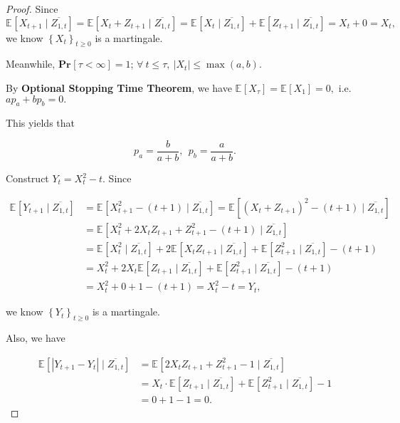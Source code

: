 \documentclass{article}
\renewcommand{\Pr}[2]{\mathbf{Pr}_{#1}\left[#2\right]}
\newcommand{\set}[1]{\left\{#1\right\}}
\newcommand{\staExp}[2]{\mathbb{E}_{#1}\left[#2\right]}
\begin{document}
\begin{proof}
    \hspace{1.3em}
    Since $\staExp{}{X_{t+1}\mid\overline{Z_{1,t}}}=\staExp{}{X_t+Z_{t+1}\mid\overline{Z_{1,t}}}=\staExp{}{X_t\mid\overline{Z_{1,t}}}+\staExp{}{Z_{t+1}\mid\overline{Z_{1,t}}} = X_t+0=X_t,$ we know $\set{X_t}_{t\geq0}$ is a martingale.
    
    \hspace{1.3em}
    Meanwhile, $\Pr{}{\tau<\infty}=1$; $\forall\ t\le\tau,\ |X_t|\le\max(a,b)$.
    
    \hspace{1.3em}
    By \textbf{Optional Stopping Time Theorem}, we have $\staExp{}{X_\tau}=\staExp{}{X_1}=0,$ i.e. $ap_a+bp_b=0.$
    
    \hspace{1.3em}
    This yields that 
    
    \vspace{-2em}
    $$p_a=\frac{b}{a+b},\ \ p_b=\frac{a}{a+b}.$$
    
    \vspace{0.5em} \hspace{1.3em}
    Construct $Y_t=X_t^2-t.$ Since
    
    \vspace{-3em}
    \begin{align*}
        \staExp{}{Y_{t+1}\mid\overline{Z_{1,t}}} &= \staExp{}{X_{t+1}^2-(t+1)\mid\overline{Z_{1,t}}}=\staExp{}{(X_t+Z_{t+1})^2-(t+1)\mid\overline{Z_{1,t}}} \\
        &= \staExp{}{X_t^2+2X_tZ_{t+1}+Z_{t+1}^2-(t+1)\mid\overline{Z_{1,t}}} \\
        &= \staExp{}{X_t^2\mid\overline{Z_{1,t}}}+2\staExp{}{X_tZ_{t+1}\mid\overline{Z_{1,t}}}+\staExp{}{Z_{t+1}^2\mid\overline{Z_{1,t}}}-(t+1) \\
        &= X_t^2 + 2X_t\staExp{}{Z_{t+1}\mid\overline{Z_{1,t}}} + \staExp{}{Z_{t+1}^2\mid\overline{Z_{1,t}}} -(t+1) \\
        &= X_t^2+0+1-(t+1) = X_t^2-t = Y_t,
    \end{align*}
    
    \vspace{-1em} \hspace{1.3em}
    we know $\set{Y_t}_{t\geq0}$ is a martingale. 
    
    \hspace{1.3em}
    Also, we have
    
    \vspace{-3em}
    \begin{align*}
        \staExp{}{|Y_{t+1}-Y_t|\mid\overline{Z_{1,t}}} &= \staExp{}{2X_tZ_{t+1}+Z_{t+1}^2-1\mid \overline{Z_{1,t}}} \\
        &= X_t\cdot\staExp{}{Z_{t+1}\mid \overline{Z_{1,t}}}+\staExp{}{Z_{t+1}^2\mid\overline{Z_{1,t}}}-1 \\
        &= 0+1-1= 0. 
    \end{align*}
    

\end{proof}
\end{document}
